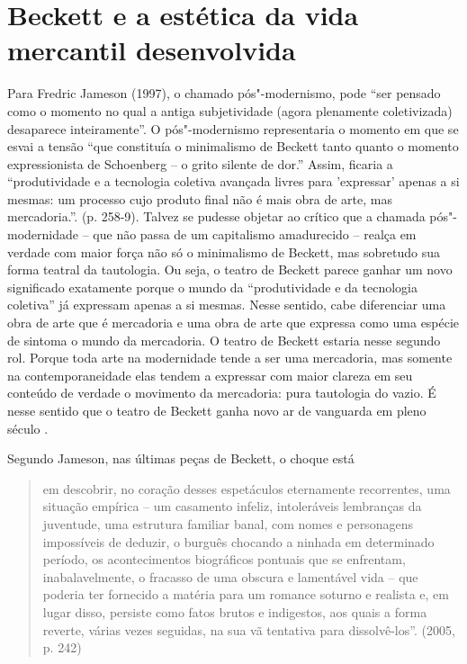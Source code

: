 \section{Beckett e a estética da vida mercantil desenvolvida}

Para Fredric Jameson (1997), o chamado pós"-modernismo, pode ``ser
pensado como o momento no qual a antiga subjetividade (agora plenamente
coletivizada) desaparece inteiramente''. O pós"-modernismo representaria
o momento em que se esvai a tensão ``que constituía o minimalismo de
Beckett tanto quanto o momento expressionista de Schoenberg -- o grito
silente de dor.'' Assim, ficaria a ``produtividade e a tecnologia
coletiva avançada livres para 'expressar' apenas a si mesmas: um
processo cujo produto final não é mais obra de arte, mas mercadoria.''.
(p. 258-9). Talvez se pudesse objetar ao crítico que a chamada
pós"-modernidade -- que não passa de um capitalismo amadurecido -- realça
em verdade com maior força não só o minimalismo de Beckett, mas
sobretudo sua forma teatral da tautologia. Ou seja, o teatro de Beckett
parece ganhar um novo significado exatamente porque o mundo da
``produtividade e da tecnologia coletiva'' já expressam apenas a si
mesmas. Nesse sentido, cabe diferenciar uma obra de arte que é
mercadoria e uma obra de arte que expressa como uma espécie de sintoma o
mundo da mercadoria. O teatro de Beckett estaria nesse segundo rol.
Porque toda arte na modernidade tende a ser uma mercadoria, mas somente
na contemporaneidade elas tendem a expressar com maior clareza em seu
conteúdo de verdade o movimento da mercadoria: pura tautologia do vazio.
É nesse sentido que o teatro de Beckett ganha novo ar de vanguarda em
pleno século .

Segundo Jameson, nas últimas peças de Beckett, o choque está

\begin{quote}
em descobrir, no coração desses espetáculos eternamente recorrentes, uma
situação empírica -- um casamento infeliz, intoleráveis lembranças da
juventude, uma estrutura familiar banal, com nomes e personagens
impossíveis de deduzir, o burguês chocando a ninhada em determinado
período, os acontecimentos biográficos pontuais que se enfrentam,
inabalavelmente, o fracasso de uma obscura e lamentável vida -- que
poderia ter fornecido a matéria para um romance soturno e realista e, em
lugar disso, persiste como fatos brutos e indigestos, aos quais a forma
reverte, várias vezes seguidas, na sua vã tentativa para dissolvê-los''.
(2005, p. 242)
\end{quote}

